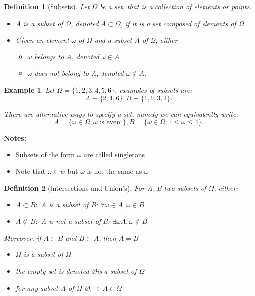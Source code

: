 \documentclass[a4paper]{article}
\newcounter{counter}
\numberwithin{counter}{subsection}
\theoremstyle{break}
\newtheorem{definition}{Definition}
\newtheorem{exmp}[counter]{Example}
\begin{document}
			\begin{definition}[Subsets]
				Let $\Omega$ be a set, that is a collection of elements or points.
				\begin{itemize}
					\item A is a subset of $\Omega$, denoted $A \subset \Omega$, if it is a set composed of elements of $\Omega$
					\item Given an element $\omega$ of $\Omega$ and a subset A of $\Omega$, either
						\begin{itemize}
							\item $\omega$ belongs to A, denoted $\omega \in A$ 
							\item $\omega$ does not belong to A, denoted $\omega \not\in A$.	

						\end{itemize}	
				\end{itemize}
			\end{definition}

			\begin{exmp}
				Let $\Omega = \{1,2,3,4,5,6\} $, examples of subsets are: \[
				A = \{2,4,6\}, B= \{1,2,3,4\} 
				.\] 

				There are alternative ways to specify a set, namely we can equivalently write: \[
					A = \{\omega \in \Omega, \omega \text{ is even } \}, B = \{\omega \in \Omega : 1 \le \omega \le 4\}  
				.\] 
			\end{exmp}

			\textbf{Notes:} 
			\begin{itemize}
				\item Subsets of the form ${\omega}$ are called singletons
				\item Note that $\omega \in {w}$ but $\omega$ is not the same as ${\omega}$
			\end{itemize}

			\begin{definition}[Intersections and Union's]
				For A, B two subsets of $\Omega$, either:
				\begin{itemize}
					\item $A \subset B:$ A is a subset of B: $\forall \omega \in A, \omega \in B$
					\item $A \not\subset B:$ A is not a subset of B: $\exists \omega A, \omega \not\in B$
				\end{itemize}

				Moreover, if $A \subset B$ and $B \subset A$, then $A = B$ 

				\begin{itemize}
					\item $\Omega$ is a subset of $\Omega$ 
					\item the empty set is denoted \O is a subset of $\Omega$
						\item for any subset A of $\Omega$ \O, $\in A \in \Omega$
				\end{itemize}
			\end{definition}
\end{document}
